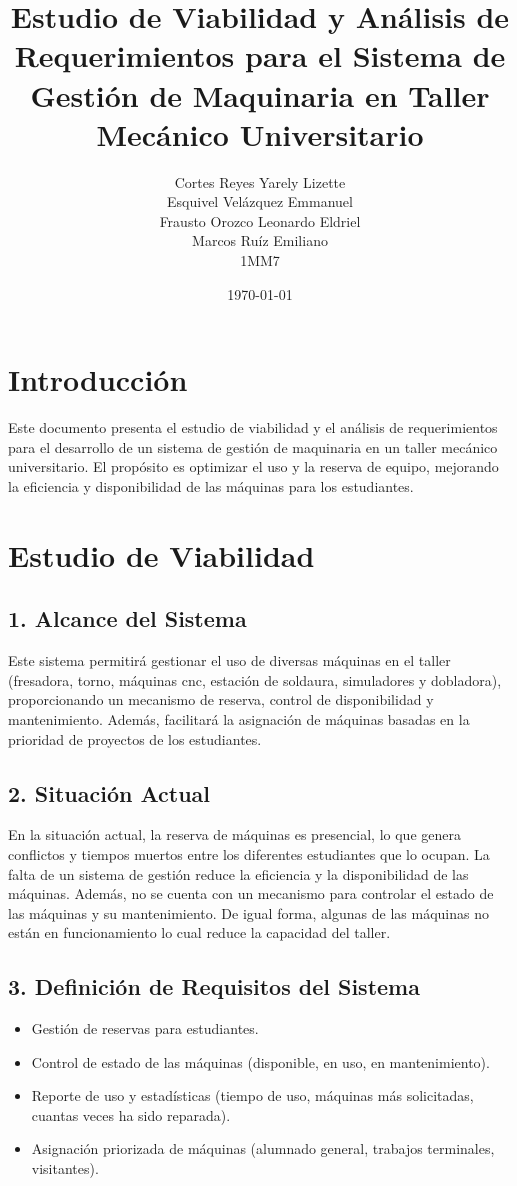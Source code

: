 \documentclass[12pt]{article}
\title{\textbf{Estudio de Viabilidad y Análisis de Requerimientos para el Sistema de Gestión de Maquinaria en Taller Mecánico Universitario}}
\author{Cortes Reyes Yarely Lizette  \\ Esquivel Velázquez Emmanuel \\ Frausto Orozco Leonardo Eldriel \\ Marcos Ruíz Emiliano \\ 1MM7}
\date{\today}
\begin{document}
\maketitle

\tableofcontents
\newpage

\section{Introducción}
Este documento presenta el estudio de viabilidad y el análisis de requerimientos para el desarrollo de un sistema de gestión de maquinaria en un taller mecánico universitario. El propósito es optimizar el uso y la reserva de equipo, mejorando la eficiencia y disponibilidad de las máquinas para los estudiantes.

\section{Estudio de Viabilidad}

\subsection{1. Alcance del Sistema}
Este sistema permitirá gestionar el uso de diversas máquinas en el taller (fresadora, torno, máquinas cnc, estación de soldaura, simuladores y dobladora), proporcionando un mecanismo de reserva, control de disponibilidad y mantenimiento. Además, facilitará la asignación de máquinas basadas en la prioridad de proyectos de los estudiantes.

\subsection{2. Situación Actual}
En la situación actual, la reserva de máquinas es presencial, lo que genera conflictos y tiempos muertos entre los diferentes estudiantes que lo ocupan. La falta de un sistema de gestión reduce la eficiencia y la disponibilidad de las máquinas. Además, no se cuenta con un mecanismo para controlar el estado de las máquinas y su mantenimiento. De igual forma, algunas de las máquinas no están en funcionamiento lo cual reduce la capacidad del taller.

\subsection{3. Definición de Requisitos del Sistema}
\begin{itemize}
    \item Gestión de reservas para estudiantes.
    \item Control de estado de las máquinas (disponible, en uso, en mantenimiento).
    \item Reporte de uso y estadísticas (tiempo de uso, máquinas más solicitadas, cuantas veces ha sido reparada).
    \item Asignación priorizada de máquinas (alumnado general, trabajos terminales, visitantes).
\end{itemize}
\end{document}
